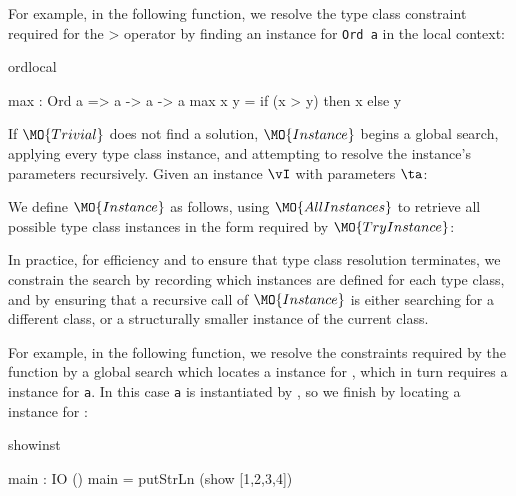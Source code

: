For example, in the following function, we resolve the type class constraint required
for the $\texttt{>}$ operator by finding an instance for \texttt{Ord a} in the local
context:

\begin{SaveVerbatim}{ordlocal}

max : Ord a => a -> a -> a
max x y = if (x > y) then x else y

\end{SaveVerbatim}

If $\MO{Trivial}$ does not find a solution, $\MO{Instance}$ begins a global search,
applying every type class instance, and attempting to resolve the instance's parameters
recursively. Given an instance $\vI$ with parameters $\ta$:


We define $\MO{Instance}$ as follows, using $\MO{AllInstances}$ to retrieve
all possible type class instances in the form required by $\MO{TryInstance}$:


In practice, for efficiency and to ensure that type class resolution terminates,
we constrain the search by recording which instances are defined for each type class,
and by ensuring that a recursive call of $\MO{Instance}$ is either searching for
a different class, or a structurally smaller instance of the current class. 

For example, in the following function, we resolve the constraints required by the 
 function by a global search which locates a  instance for
, which in turn requires a  instance for \texttt{a}.
In this case \texttt{a} is instantiated by , so we finish by locating
a  instance for :

\begin{SaveVerbatim}{showinst}

main : IO ()
main = putStrLn (show [1,2,3,4]) 

\end{SaveVerbatim}

